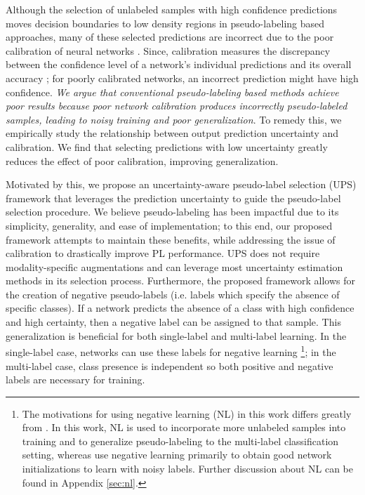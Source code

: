 \documentclass{article} \usepackage{iclr2021_conference,times}
\begin{document}
Although the selection of unlabeled samples with high confidence predictions moves decision boundaries to low density regions in pseudo-labeling based approaches, many of these selected predictions are incorrect due to the poor calibration of neural networks \citep{pmlr-v70-guo17a}. Since, calibration measures the discrepancy between the confidence level of a network's individual predictions and its overall accuracy \citep{doi:10.1080/01621459.1982.10477856, Degroot1983TheCA}; for poorly calibrated networks, an incorrect prediction might have high confidence. {\em We argue that conventional pseudo-labeling based methods achieve poor results because poor network calibration produces incorrectly pseudo-labeled samples, leading to noisy training and poor generalization}. To remedy this, we empirically study the relationship between output prediction uncertainty and calibration. We find that selecting predictions with low uncertainty greatly reduces the effect of poor calibration, improving generalization. 


Motivated by this, we propose an uncertainty-aware pseudo-label selection (UPS) framework that leverages the prediction uncertainty to guide the pseudo-label selection procedure. We believe pseudo-labeling has been impactful due to its simplicity, generality, and ease of implementation; to this end, our proposed framework attempts to maintain these benefits, while addressing the issue of calibration to drastically improve PL performance. UPS does not require modality-specific augmentations and can leverage most uncertainty estimation methods in its selection process. Furthermore, the proposed framework allows for the creation of negative pseudo-labels (i.e. labels which specify the absence of specific classes). If a network predicts the absence of a class with high confidence and high certainty, then a negative label can be assigned to that sample. This generalization is beneficial for both single-label and multi-label learning. In the single-label case, networks can use these labels for negative learning \citep{kim2019nlnl}\footnote{The motivations for using negative learning (NL) in this work differs greatly from \cite{kim2019nlnl}. In this work, NL is used to incorporate more unlabeled samples into training and to generalize pseudo-labeling to the multi-label classification setting, whereas \cite{kim2019nlnl} use negative learning primarily to obtain good network initializations to learn with noisy labels. Further discussion about NL can be found in Appendix \ref{sec:nl}.}; in the multi-label case, class presence is independent so both positive and negative labels are necessary for training.
\end{document}
